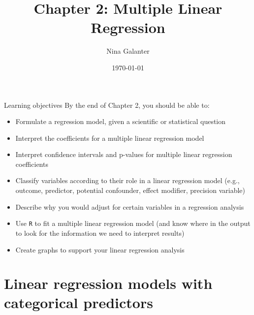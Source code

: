 \documentclass[10pt,t]{beamer}
\title{Chapter 2: Multiple Linear Regression}
\author{Nina Galanter}
\date{\today}
\begin{document}
	\begin{frame}
	\titlepage 
\end{frame}

\begin{frame}{Learning objectives}
By the end of Chapter 2, you should be able to:
\begin{itemize}
	\item Formulate a regression model, given a scientific or statistical question
	\item Interpret the coefficients for a multiple linear regression model
	\item Interpret confidence intervals and p-values for multiple linear regression coefficients
	\item Classify variables according to their role in a linear regression model (e.g., outcome, predictor, potential confounder, effect modifier, precision variable)
	\item Describe why you would adjust for certain variables in a regression analysis
	\item Use \texttt{R} to fit a multiple linear regression model (and know where in the output to look for the information we need to interpret results)
	\item Create graphs to support your linear regression analysis
\end{itemize}
\end{frame}






\section{Linear regression models with categorical predictors}
\end{document}
